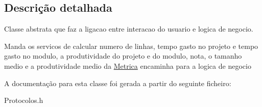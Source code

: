 \subsection{\-Descrição detalhada}
\-Classe abstrata que faz a ligacao entre interacao do usuario e logica de negocio. 

\-Manda os servicos de calcular numero de linhas, tempo gasto no projeto e tempo gasto no modulo, a produtividade do projeto e do modulo, nota, o tamanho medio e a produtividade medio da \hyperlink{class_metrica}{\-Metrica} encaminha para a logica de negocio 

\-A documentação para esta classe foi gerada a partir do seguinte ficheiro\-:\begin{DoxyCompactItemize}
\item 
\-Protocolos.\-h\end{DoxyCompactItemize}
